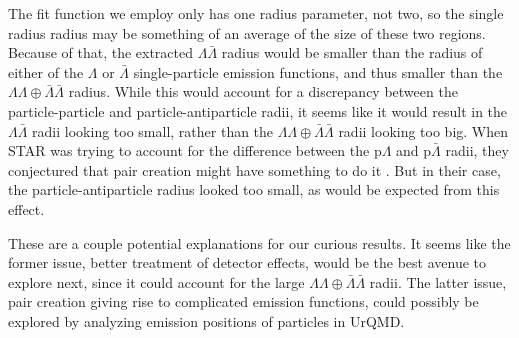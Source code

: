 The fit function we employ only has one radius parameter, not two, so the single radius radius may be something of an average of the size of these two regions.
Because of that, the extracted $\Lambda\bar{\Lambda}$ radius would be smaller than the radius of either of the $\Lambda$ or $\bar{\Lambda}$ single-particle emission functions, and thus smaller than the $\Lambda\Lambda\oplus\bar{\Lambda}\bar{\Lambda}$ radius.
While this would account for a discrepancy between the particle-particle and particle-antiparticle radii, it seems like it would result in the $\Lambda\bar{\Lambda}$ radii looking too small, rather than the $\Lambda\Lambda\oplus\bar{\Lambda}\bar{\Lambda}$ radii looking too big.
When STAR was trying to account for the difference between the p$\Lambda$ and p$\bar{\Lambda}$ radii, they conjectured that pair creation might have something to do it \cite{Adams:2005ws}.
But in their case, the particle-antiparticle radius looked too small, as would be expected from this effect.

These are a couple potential explanations for our curious results.
It seems like the former issue, better treatment of detector effects, would be the best avenue to explore next, since it could account for the large $\Lambda\Lambda\oplus\bar{\Lambda}\bar{\Lambda}$ radii.
The latter issue, pair creation giving rise to complicated emission functions, could possibly be explored by analyzing emission positions of particles in UrQMD.



